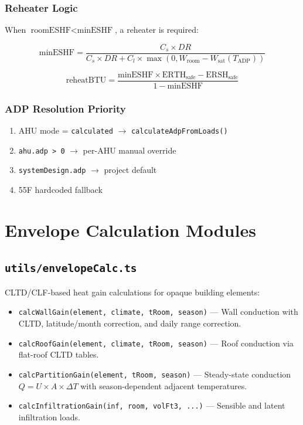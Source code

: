 \documentclass[12pt, a4paper, oneside]{report}
\newcommand{\file}[1]{\texttt{\textcolor{codeblue}{#1}}}
\newcommand{\code}[1]{\texttt{\textcolor{codered}{#1}}}
\begin{document}
\subsection{Reheater Logic}

When $\text{roomESHF} < \text{minESHF}$, a reheater is required:

\begin{equation}
  \text{minESHF} = \frac{C_s \times DR}{C_s \times DR + C_l \times \max(0, W_{\text{room}} - W_{\text{sat}}(T_{\text{ADP}}))}
\end{equation}

\begin{equation}
  \text{reheatBTU} = \frac{\text{minESHF} \times \text{ERTH}_{\text{safe}} - \text{ERSH}_{\text{safe}}}{1 - \text{minESHF}}
\end{equation}

\subsection{ADP Resolution Priority}

\begin{enumerate}
  \item AHU mode = \code{calculated} $\rightarrow$ \code{calculateAdpFromLoads()}
  \item \code{ahu.adp > 0} $\rightarrow$ per-AHU manual override
  \item \code{systemDesign.adp} $\rightarrow$ project default
  \item 55\textdegree F hardcoded fallback
\end{enumerate}


\chapter{Envelope Calculation Modules}

\section{\file{utils/envelopeCalc.ts}}

CLTD/CLF-based heat gain calculations for opaque building elements:
\begin{itemize}
  \item \code{calcWallGain(element, climate, tRoom, season)} --- Wall conduction with CLTD, latitude/month correction, and daily range correction.
  \item \code{calcRoofGain(element, climate, tRoom, season)} --- Roof conduction via flat-roof CLTD tables.
  \item \code{calcPartitionGain(element, tRoom, season)} --- Steady-state conduction $Q = U \times A \times \Delta T$ with season-dependent adjacent temperatures.
  \item \code{calcInfiltrationGain(inf, room, volFt3, ...)} --- Sensible and latent infiltration loads.
\end{itemize}
\end{document}
